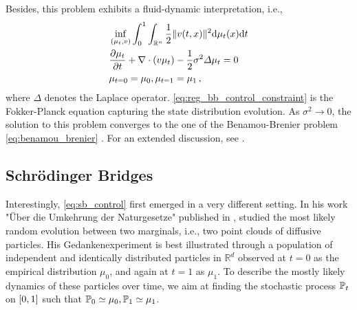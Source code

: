 Besides, this problem exhibits a fluid-dynamic interpretation, i.e.,
\begin{align}
	& \inf _{(\mu_t, v)} \int_0^1 \int_{\mathbb{R}^n}\frac{1}{2}\lVert v(t, x)\rVert^2 \mathrm{d}\mu_t(x) \mathrm{d} t \\
	\label{eq:reg_bb_control_constraint} & \frac{\partial \mu_t}{\partial t}+\nabla \cdot(v \mu_t) - \frac{1}{2}\sigma^2 \Delta \mu_t = 0 \\
	& \nonumber \mu_{t=0}=\mu_0, \mu_{t=1}=\mu_1\,,
\end{align}
where $\Delta$ denotes the Laplace operator.
\eqref{eq:reg_bb_control_constraint} is the Fokker-Planck equation capturing the state distribution evolution.
As $\sigma^2 \rightarrow 0$, the solution to this problem converges to the one of the Benamou-Brenier problem \eqref{eq:benamou_brenier} \citep{mikami2008optimal}.
For an extended discussion, see \citet{dai1991stochastic, mikami2000dynamical, mikami2002optimal}.


\subsection{Schr{\"o}dinger Bridges} \label{sec:background_sb}

Interestingly, \cref{eq:sb_control} first emerged in a very different setting.
In his work "{\"U}ber die Umkehrung der Naturgesetze" published in \citeyear{schrodinger1931umkehrung}, \citeauthor{schrodinger1931umkehrung} studied the most likely random evolution between two marginals, i.e., two point clouds of diffusive particles.
His Gedankenexperiment is best illustrated through a population of independent and identically distributed particles in $\mathbb{R}^d$ observed at $t=0$ as the empirical distribution $\mu_0$, and again at $t=1$ as $\mu_1$.
To describe the mostly likely dynamics of these particles over time, we aim at finding the stochastic process $\mathbb{P}_{{t}}$ on $[0,1]$ such that $\mathbb{P}_{{0}} \simeq \mu_0, \mathbb{P}_{{1}} \simeq \mu_1$.

